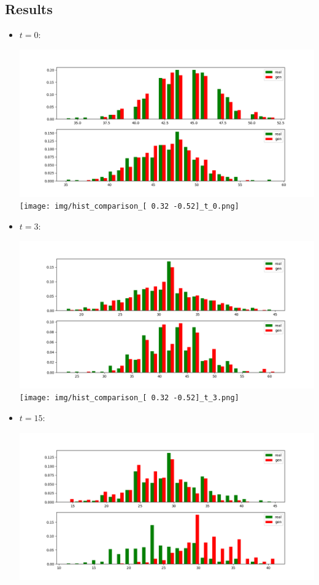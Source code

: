 \documentclass{article}
\begin{document}
\subsection{Results}
\begin{itemize}
    \item $t = 0$:
    \begin{center}
        \includegraphics[scale = 0.18]{img/hist_comparison_[ 0.04 -0.08]_t_0.png}
        \texttt{[image: img/hist\_comparison\_[  0.32 -0.52]\_t\_0.png]}
    \end{center}
    \item $t = 3$:
        \begin{center}
        \includegraphics[scale = 0.18]{img/hist_comparison_[ 0.04 -0.08]_t_3.png}
        \texttt{[image: img/hist\_comparison\_[  0.32 -0.52]\_t\_3.png]}
    \end{center}
    \item $t = 15$:
        \begin{center}
        \includegraphics[scale = 0.18]{img/hist_comparison_[ 0.04 -0.08]_t_15.png}

\end{center}
\end{itemize}
\end{document}

